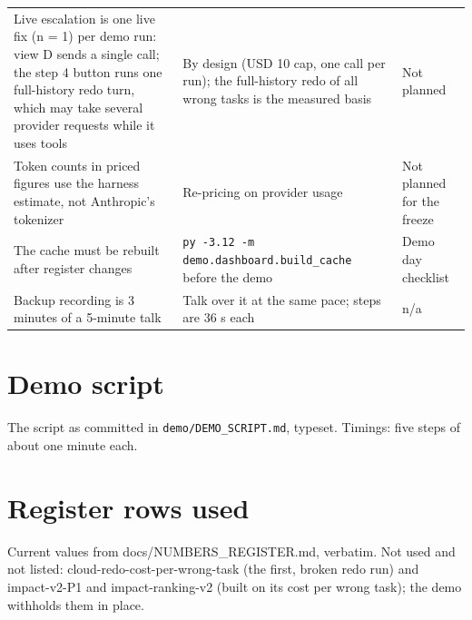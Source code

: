 \documentclass[11pt]{article}
\begin{document}
\begin{longtable}{>{\raggedright\arraybackslash}p{}>{\raggedright\arraybackslash}p{}>{\raggedright\arraybackslash}p{}}
Live escalation is one live fix (n = 1) per demo run: view D sends a single call; the step 4 button runs one
full-history redo turn, which may take several provider requests while it uses tools & By design (USD 10 cap, one call
per run); the full-history redo of all wrong tasks is the measured basis & Not planned\\
Token counts in priced figures use the harness estimate, not Anthropic's tokenizer & Re-pricing on provider usage &
Not planned for the freeze\\
The cache must be rebuilt after register changes & \texttt{py -3.12 -m demo.dashboard.build\_cache} before the demo &
Demo day checklist\\
Backup recording is 3 minutes of a 5-minute talk & Talk over it at the same pace; steps are 36 s each & n/a\\
\bottomrule
\end{longtable}

\appendix
\section{Demo script}
\setlength{\parindent}{0pt}\setlength{\parskip}{4pt}
The script as committed in \texttt{demo/DEMO\_SCRIPT.md}, typeset. Timings: five steps of about one minute each.


\section{Register rows used}
Current values from docs/NUMBERS\_REGISTER.md, verbatim. Not used and not listed: cloud-redo-cost-per-wrong-task (the
first, broken redo run) and impact-v2-P1 and impact-ranking-v2 (built on its cost per wrong task); the demo withholds
them in place.

\end{document}
